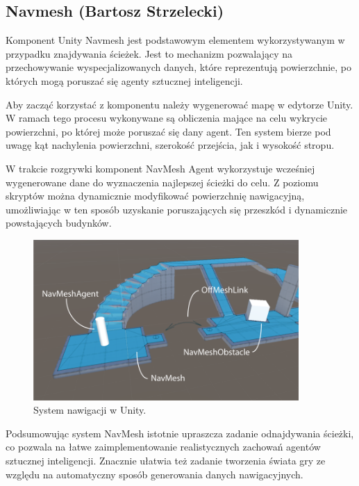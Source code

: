 \subsection{Navmesh (Bartosz Strzelecki)}

Komponent Unity Navmesh jest podstawowym elementem wykorzystywanym w przypadku znajdywania ścieżek.
Jest to mechanizm pozwalający na przechowywanie wyspecjalizowanych danych, które reprezentują
powierzchnie, po których mogą poruszać się agenty sztucznej inteligencji.

Aby zacząć korzystać z komponentu należy wygenerować mapę w edytorze Unity.
W ramach tego procesu wykonywane są obliczenia mające na celu wykrycie powierzchni,
po której może poruszać się dany agent. Ten system bierze pod uwagę kąt nachylenia
powierzchni, szerokość przejścia, jak i wysokość stropu.

W trakcie rozgrywki komponent NavMesh Agent wykorzystuje wcześniej wygenerowane dane
do wyznaczenia najlepszej ścieżki do celu. Z poziomu skryptów można dynamicznie modyfikować powierzchnię
nawigacyjną, umożliwiając w ten sposób uzyskanie poruszających się przeszkód i dynamicznie powstających budynków.

\begin{figure}[h!]
    \centering
    \includegraphics[width=0.9\textwidth]{images/navmesh.png}
    \caption{System nawigacji w Unity.}
\end{figure}

Podsumowując system NavMesh istotnie upraszcza zadanie odnajdywania ścieżki, co pozwala na łatwe zaimplementowanie
realistycznych zachowań agentów sztucznej inteligencji. Znacznie ułatwia też zadanie tworzenia świata gry ze względu na automatyczny
sposób generowania danych nawigacyjnych.

